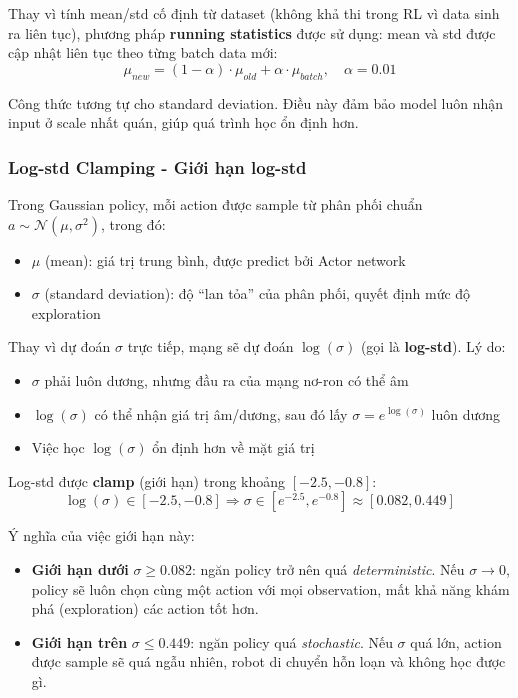 Thay vì tính mean/std cố định từ dataset (không khả thi trong RL vì data sinh ra liên tục), phương pháp \textbf{running statistics} được sử dụng: mean và std được cập nhật liên tục theo từng batch data mới:
\begin{equation}
\mu_{new} = (1-\alpha) \cdot \mu_{old} + \alpha \cdot \mu_{batch}, \quad \alpha = 0.01
\end{equation}

Công thức tương tự cho standard deviation. Điều này đảm bảo model luôn nhận input ở scale nhất quán, giúp quá trình học ổn định hơn.

\subsubsection{Log-std Clamping - Giới hạn log-std}

Trong Gaussian policy, mỗi action được sample từ phân phối chuẩn $a \sim \mathcal{N}(\mu, \sigma^2)$, trong đó:
\begin{itemize}[nosep]
\item $\mu$ (mean): giá trị trung bình, được predict bởi Actor network
\item $\sigma$ (standard deviation): độ ``lan tỏa'' của phân phối, quyết định mức độ exploration
\end{itemize}

Thay vì dự đoán $\sigma$ trực tiếp, mạng sẽ dự đoán $\log(\sigma)$ (gọi là \textbf{log-std}). Lý do:
\begin{itemize}[nosep]
\item $\sigma$ phải luôn dương, nhưng đầu ra của mạng nơ-ron có thể âm
\item $\log(\sigma)$ có thể nhận giá trị âm/dương, sau đó lấy $\sigma = e^{\log(\sigma)}$ luôn dương
\item Việc học $\log(\sigma)$ ổn định hơn về mặt giá trị
\end{itemize}

Log-std được \textbf{clamp} (giới hạn) trong khoảng $[-2.5, -0.8]$:
\begin{equation}
\log(\sigma) \in [-2.5, -0.8] \Rightarrow \sigma \in [e^{-2.5}, e^{-0.8}] \approx [0.082, 0.449]
\end{equation}

Ý nghĩa của việc giới hạn này:
\begin{itemize}[nosep]
\item \textbf{Giới hạn dưới} $\sigma \geq 0.082$: ngăn policy trở nên quá \textit{deterministic}. Nếu $\sigma \to 0$, policy sẽ luôn chọn cùng một action với mọi observation, mất khả năng khám phá (exploration) các action tốt hơn.
\item \textbf{Giới hạn trên} $\sigma \leq 0.449$: ngăn policy quá \textit{stochastic}. Nếu $\sigma$ quá lớn, action được sample sẽ quá ngẫu nhiên, robot di chuyển hỗn loạn và không học được gì.
\end{itemize}

